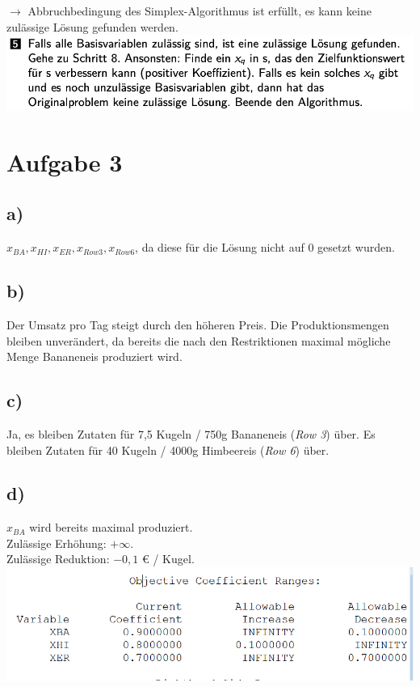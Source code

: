 \documentclass[a4paper,11pt]{article}
\begin{document}
$\to$ Abbruchbedingung des Simplex-Algorithmus ist erfüllt, es kann keine zulässige Lösung gefunden werden. \\

\vspace{4mm}
\includegraphics[width=.7\linewidth]{src/unzulaessig.png}

\section*{Aufgabe 3}
\subsection*{a)}
$x_{BA}, x_{HI}, x_{ER}, x_{Row3}, x_{Row6}$, da diese für die Lösung nicht auf 0 gesetzt wurden.

\subsection*{b)}
Der Umsatz pro Tag steigt durch den höheren Preis.
Die Produktionsmengen bleiben unverändert, da bereits die nach den Restriktionen maximal mögliche Menge Bananeneis produziert wird.

\subsection*{c)}
Ja, es bleiben Zutaten für 7,5 Kugeln / 750g Bananeneis (\emph{Row 3}) über.
Es bleiben Zutaten für 40 Kugeln / 4000g Himbeereis (\emph{Row 6}) über.

\subsection*{d)}
$x_{BA}$ wird bereits maximal produziert.\\
Zulässige Erhöhung: $+ \infty$. \\
Zulässige Reduktion: $-0,1$ € / Kugel. \\

\includegraphics[width=.8\linewidth]{src/zielfunktion.png}
\end{document}
